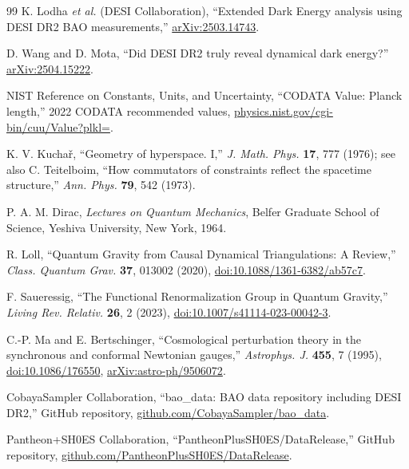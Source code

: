 \documentclass[aps,prd,reprint,nofootinbib,superscriptaddress,floatfix]{revtex4-2}
\numberwithin{equation}{section}
\theoremstyle{definition}
\theoremstyle{plain}
\begin{document}
\begin{thebibliography}{99}
K. Lodha \emph{et al.} (DESI Collaboration),
``Extended Dark Energy analysis using DESI DR2 BAO measurements,''
\href{https://arxiv.org/abs/2503.14743}{arXiv:2503.14743}.

D. Wang and D. Mota,
``Did DESI DR2 truly reveal dynamical dark energy?''
\href{https://arxiv.org/abs/2504.15222}{arXiv:2504.15222}.

NIST Reference on Constants, Units, and Uncertainty,
``CODATA Value: Planck length,''
2022 CODATA recommended values,
\href{https://physics.nist.gov/cgi-bin/cuu/Value?plkl=}{physics.nist.gov/cgi-bin/cuu/Value?plkl=}.



K. V. Kucha\v{r}, ``Geometry of hyperspace. I,''
\emph{J. Math. Phys.} \textbf{17}, 777 (1976);
see also C. Teitelboim, ``How commutators of constraints reflect the spacetime structure,''
\emph{Ann. Phys.} \textbf{79}, 542 (1973).

P. A. M. Dirac, \emph{Lectures on Quantum Mechanics}, Belfer Graduate School of Science, Yeshiva University, New York, 1964.

R. Loll, ``Quantum Gravity from Causal Dynamical Triangulations: A Review,''
\emph{Class. Quantum Grav.} \textbf{37}, 013002 (2020),
\href{https://doi.org/10.1088/1361-6382/ab57c7}{doi:10.1088/1361-6382/ab57c7}.

F. Saueressig, ``The Functional Renormalization Group in Quantum Gravity,''
\emph{Living Rev. Relativ.} \textbf{26}, 2 (2023),
\href{https://doi.org/10.1007/s41114-023-00042-3}{doi:10.1007/s41114-023-00042-3}.


C.-P. Ma and E. Bertschinger,
``Cosmological perturbation theory in the synchronous and conformal Newtonian gauges,''
\emph{Astrophys. J.} \textbf{455}, 7 (1995),
\href{https://doi.org/10.1086/176550}{doi:10.1086/176550},
\href{https://arxiv.org/abs/astro-ph/9506072}{arXiv:astro-ph/9506072}.

CobayaSampler Collaboration,
``bao\_data: BAO data repository including DESI DR2,''
GitHub repository,
\href{https://github.com/CobayaSampler/bao_data}{github.com/CobayaSampler/bao\_data}.

Pantheon+SH0ES Collaboration,
``PantheonPlusSH0ES/DataRelease,''
GitHub repository,
\href{https://github.com/PantheonPlusSH0ES/DataRelease}{github.com/PantheonPlusSH0ES/DataRelease}.


\end{thebibliography}
\end{document}
